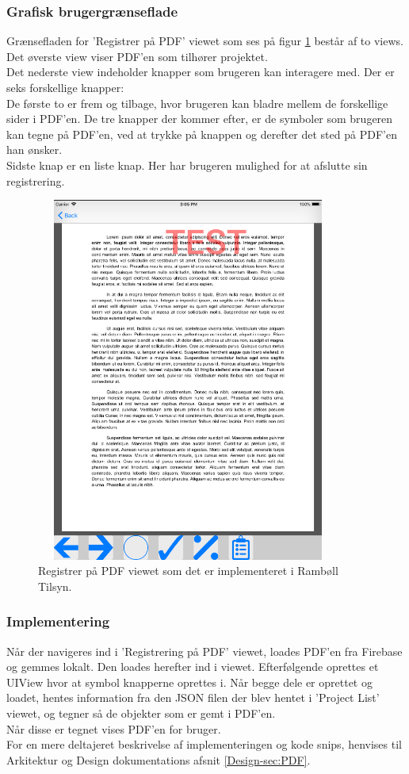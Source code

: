 \subsubsection{Grafisk brugergrænseflade}
Grænsefladen for 'Registrer på PDF' viewet som ses på figur \ref{fig:RegistrerObjekterView} består af to views. 
Det øverste view viser PDF'en som tilhører projektet. \\
Det nederste view indeholder knapper som brugeren kan interagere med. Der er seks forskellige knapper: \\
De første to er frem og tilbage, hvor brugeren kan bladre mellem de forskellige sider i PDF'en. De tre knapper der kommer efter, er de symboler som brugeren kan tegne på PDF'en, ved at trykke på knappen og derefter det sted på PDF'en han ønsker. \\
Sidste knap er en liste knap. Her har brugeren mulighed for at afslutte sin registrering.
\begin{figure}[H] %
	\centering
	\includegraphics[height=12cm, width=10cm]{Design/Applikation/RegistrePDF/PDF}
	\caption{Registrer på PDF viewet som det er implementeret i Rambøll Tilsyn.}
	\label{fig:RegistrerObjekterView}
\end{figure}

\subsubsection{Implementering}
Når der navigeres ind i 'Registrering på PDF' viewet, loades PDF'en fra Firebase og gemmes lokalt. Den loades herefter ind i viewet. Efterfølgende oprettes et UIView hvor at symbol knapperne oprettes i. Når begge dele er oprettet og loadet, hentes information fra den JSON filen der blev hentet i 'Project List' viewet, og tegner så de objekter som er gemt i PDF'en. \\
Når disse er tegnet vises PDF'en for bruger. \\
For en mere deltajeret beskrivelse af implementeringen og kode snips, henvises til Arkitektur og Design dokumentations afsnit \ref{Design-sec:PDF}.


\clearpage